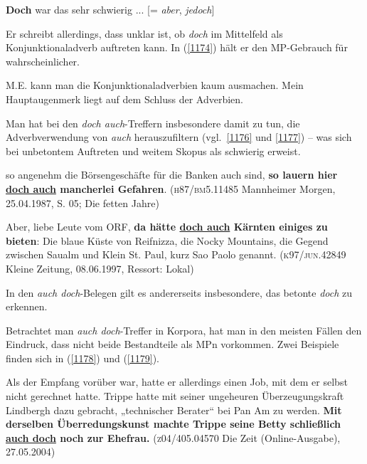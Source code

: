 \begin{exe}
	\ex\label{1175} 
	\textbf{Doch} war das sehr schwierig ... [= \textit{aber}, \textit{jedoch}] 
\end{exe}	
Er schreibt allerdings, dass unklar ist, ob \textit{doch} im Mittelfeld als Konjunktionaladverb  auftreten kann. In (\ref{1174}) hält er den MP-Gebrauch für wahrscheinlicher.

M.E. kann man die Konjunktionaladverbien kaum ausmachen. Mein Hauptau\-genmerk liegt auf dem Schluss der Adverbien.

Man hat bei den \textit{doch auch}-Treffern insbesondere damit zu tun, die Adverbverwendung von \textit{auch} herauszufiltern (vgl.\ \ref{1176} und \ref{1177}) – was sich bei unbetontem Auftreten und weitem Skopus als schwierig erweist.

\begin{exe}
	\ex\label{1176} 
	so angenehm die Börsengeschäfte für die Banken auch sind, \textbf{so lauern hier \ul{doch auch} mancherlei Gefahren}.
	\newline(\textsc{h87/bm5.11485} Mannheimer Morgen, 25.04.1987, S. 05; Die fetten Jahre)\\
\end{exe}\pagebreak

\begin{exe}
	\ex\label{1177} 
	Aber, liebe Leute vom ORF, \textbf{da hätte \ul{doch auch} Kärnten einiges zu bieten}: Die blaue Küste von Reifnizza, die Nocky Mountains, die 		Gegend zwischen Saualm und Klein St. Paul, kurz Sao Paolo genannt. 
	\newline(\textsc{k97/jun.42849} Kleine Zeitung, 08.06.1997, Ressort: Lokal)\\
\end{exe}	
In den \textit{auch doch}-Belegen gilt es andererseits insbesondere, das betonte \textit{doch} zu erkennen. 

Betrachtet man \textit{auch doch}-Treffer in Korpora, hat man in den meisten Fällen den Eindruck, dass nicht beide Bestandteile als MPn vorkommen. Zwei Beispiele finden sich in (\ref{1178}) und (\ref{1179}). 

\begin{exe}
	\ex\label{1178} 
	Als der Empfang vorüber war, hatte er allerdings einen Job, mit dem er selbst nicht gerechnet hatte. Trippe hatte mit seiner ungeheuren 					Überzeugungskraft Lindbergh dazu gebracht, „technischer Berater“ bei Pan Am zu werden. \textbf{Mit derselben Überredungskunst machte Trippe 		seine Betty schließlich \ul{auch doch} noch zur Ehefrau.}
	\newline(\textsc{z04/405.04570} Die Zeit (Online-Ausgabe), 27.05.2004)\\
\end{exe}

